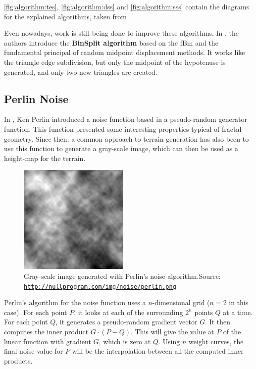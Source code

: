 \documentclass{acmtog}
\begin{document}
\autoref{fig:algorithm:tes}, \autoref{fig:algorithm:dss} and \autoref{fig:algorithm:sss} contain the diagrams for the explained algorithms, taken from \cite{Macklem03}.

Even nowadays, work is still being done to improve these algorithms. In \cite{Chen11}, the authors introduce the \textbf{BinSplit algorithm} based on the fBm and the fundamental principal of random midpoint displacement methods. It works like the triangle edge subdivision, but only the midpoint of the hypotenuse is generated, and only two new triangles are created.

\subsection{Perlin Noise}
In \cite{Perlin85}, Ken Perlin introduced a noise function based in a pseudo-random generator function. This function presented some interesting properties typical of fractal geometry. Since then, a common approach to terrain generation has also been to use this function to generate a gray-scale image, which can then be used as a height-map for the terrain.

\begin{figure}
	\begin{center}
		\includegraphics[width=0.6\columnwidth]{images/perlin.png}
	\end{center}
	\caption{Gray-scale image generated with Perlin's noise algorithm.\newline Source: \texttt{\url{http://nullprogram.com/img/noise/perlin.png}}}
	\label{fig:perlin}
\end{figure}

Perlin's algorithm for the noise function uses a $n$-dimensional grid ($n=2$ in this case). For each point $P$, it looks at each of the surrounding $2^{n}$ points $Q$ at a time. For each point $Q$, it generates a pseudo-random gradient vector $G$. It then computes the inner product $G \cdot ( P - Q )$. This will give the value at $P$ of the linear function with gradient $G$, which is zero at $Q$. Using $n$ weight curves, the final noise value for $P$ will be the interpolation between all the computed inner products.
\end{document}
